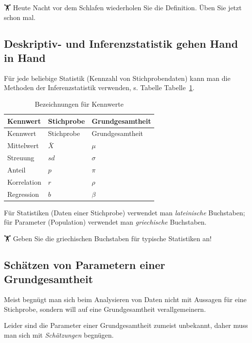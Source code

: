 \documentclass[
  a4paper,
  DIV=11]{scrreprt}
\theoremstyle{definition}
\theoremstyle{remark}
\begin{document}
🏋️️ Heute Nacht vor dem Schlafen wiederholen Sie die Definition. Üben Sie
jetzt schon mal.

\hypertarget{deskriptiv--und-inferenzstatistik-gehen-hand-in-hand}{%
\subsection{Deskriptiv- und Inferenzstatistik gehen Hand in
Hand}\label{deskriptiv--und-inferenzstatistik-gehen-hand-in-hand}}

Für jede beliebige Statistik (Kennzahl von Stichprobendaten) kann man
die Methoden der Inferenzstatistik verwenden, s. Tabelle
Tabelle~\ref{tbl-kennwerte}.

\hypertarget{tbl-kennwerte}{}
\begin{longtable}[]{@{}lll@{}}
\caption{\label{tbl-kennwerte}Bezeichnungen für
Kennwerte}\tabularnewline
\toprule()
Kennwert & Stichprobe & Grundgesamtheit \\
\midrule()
\endfirsthead
\toprule()
Kennwert & Stichprobe & Grundgesamtheit \\
\midrule()
\endhead
Mittelwert & \(\bar{X}\) & \(\mu\) \\
Streuung & \(sd\) & \(\sigma\) \\
Anteil & \(p\) & \(\pi\) \\
Korrelation & \(r\) & \(\rho\) \\
Regression & \(b\) & \(\beta\) \\
\bottomrule()
\end{longtable}

Für Statistiken (Daten einer Stichprobe) verwendet man
\emph{lateinische} Buchstaben; für Parameter (Population) verwendet man
\emph{griechische} Buchstaben.

🏋️ Geben Sie die griechischen Buchstaben für typische Statistiken an!

\hypertarget{schuxe4tzen-von-parametern-einer-grundgesamtheit}{%
\subsection{Schätzen von Parametern einer
Grundgesamtheit}\label{schuxe4tzen-von-parametern-einer-grundgesamtheit}}

Meist begnügt man sich beim Analysieren von Daten nicht mit Aussagen für
eine Stichprobe, sondern will auf eine Grundgesamtheit verallgemeinern.

Leider sind die Parameter einer Grundgesamtheit zumeist unbekannt, daher
muss man sich mit \emph{Schätzungen} begnügen.
\end{document}
